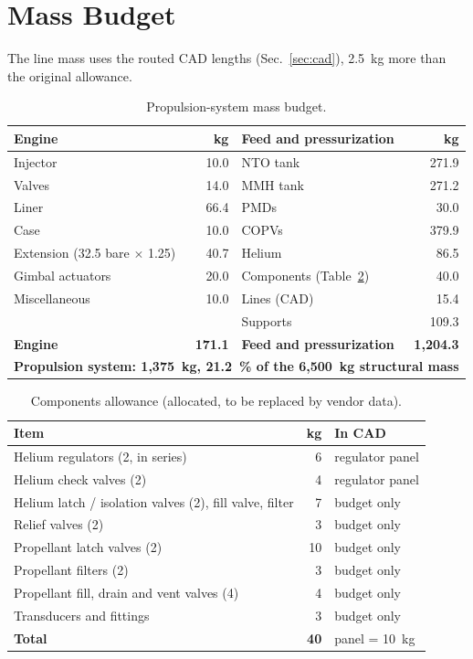 \documentclass[10pt]{article}
\begin{document}
\section{Mass Budget}
The line mass uses the routed CAD lengths (Sec.~\ref{sec:cad}), 2.5~kg more than the original allowance.
\begin{table}[H]\centering\small\caption{Propulsion-system mass budget.}\label{tab:mass}
\begin{tabular}{lr|lr}\toprule
Engine & kg & Feed and pressurization & kg \\\midrule
Injector & 10.0 & NTO tank & 271.9 \\
Valves & 14.0 & MMH tank & 271.2 \\
Liner & 66.4 & PMDs & 30.0 \\
Case & 10.0 & COPVs & 379.9 \\
Extension (32.5 bare $\times$ 1.25) & 40.7 & Helium & 86.5 \\
Gimbal actuators & 20.0 & Components (Table~\ref{tab:comp}) & 40.0 \\
Miscellaneous & 10.0 & Lines (CAD) & 15.4 \\
 & & Supports & 109.3 \\\midrule
\textbf{Engine} & \textbf{171.1} & \textbf{Feed and pressurization} & \textbf{1{,}204.3} \\\midrule
\multicolumn{4}{l}{\textbf{Propulsion system: 1{,}375~kg, 21.2~\% of the 6{,}500~kg structural mass}} \\
\bottomrule\end{tabular}\end{table}
\begin{table}[H]\centering\small\caption{Components allowance (allocated, to be replaced by vendor data).}\label{tab:comp}
\begin{tabular}{lrl}\toprule
Item & kg & In CAD \\\midrule
Helium regulators (2, in series) & 6 & regulator panel \\
Helium check valves (2) & 4 & regulator panel \\
Helium latch / isolation valves (2), fill valve, filter & 7 & budget only \\
Relief valves (2) & 3 & budget only \\
Propellant latch valves (2) & 10 & budget only \\
Propellant filters (2) & 3 & budget only \\
Propellant fill, drain and vent valves (4) & 4 & budget only \\
Transducers and fittings & 3 & budget only \\\midrule
\textbf{Total} & \textbf{40} & panel = 10~kg \\
\bottomrule\end{tabular}\end{table}
\end{document}
